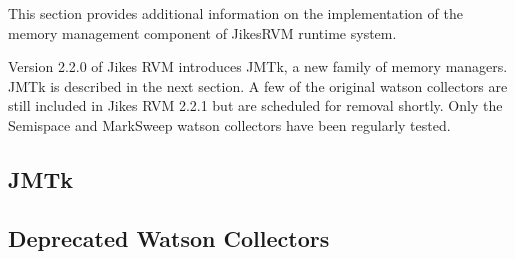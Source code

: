 This section provides additional information on the implementation
of the memory management component of Jikes\trademark RVM runtime system.

Version 2.2.0 of Jikes RVM introduces JMTk, a new family of memory
managers. JMTk is described in the next section. A few of the original
watson collectors are still included in Jikes RVM 2.2.1 but are
scheduled for removal shortly.  Only the Semispace and
MarkSweep watson collectors have been regularly tested. 
 
\subsection{JMTk}


\subsection{Deprecated Watson Collectors}


